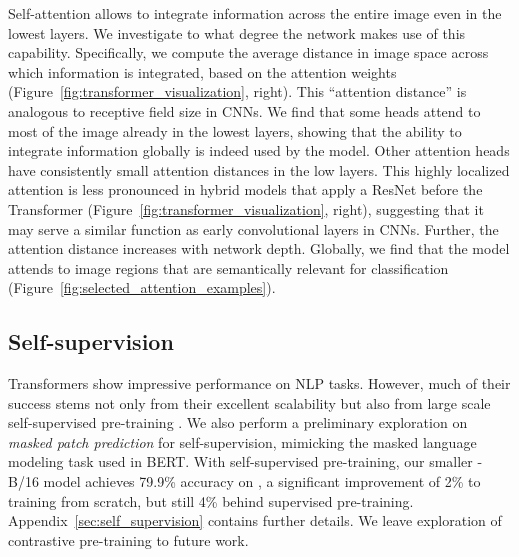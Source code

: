 Self-attention allows \oursabbrv to integrate information across the entire image even in the lowest layers. We investigate to what degree the network makes use of this capability. Specifically, we compute the average distance in image space across which information is integrated, based on the attention weights (Figure~\ref{fig:transformer_visualization}, right). This ``attention distance'' is analogous to receptive field size in CNNs. We find that some heads attend to most of the image already in the lowest layers, showing that the ability to integrate information globally is indeed used by the model. Other attention heads have consistently small attention distances in the low layers. This highly localized attention is less pronounced in hybrid models that apply a ResNet before the Transformer (Figure~\ref{fig:transformer_visualization}, right), suggesting that it may serve a similar function as early convolutional layers in CNNs. 
Further, the attention distance increases with network depth.
Globally, we find that the model attends to image regions that are semantically relevant for classification (Figure~\ref{fig:selected_attention_examples}).


\subsection{Self-supervision}
Transformers show impressive performance on NLP tasks. However, much of their success stems not only from their excellent scalability but also from large scale self-supervised pre-training \citep{devlin19-bert,radford2018-gpt}. We also perform a preliminary exploration on \textit{masked patch prediction} for self-supervision, mimicking the masked language modeling task used in BERT. With self-supervised pre-training, our smaller \oursabbrv-B/16 model achieves 79.9\% accuracy on \imagenet{}, a significant improvement of 2\% to training from scratch, but still 4\% behind supervised pre-training. Appendix~\ref{sec:self_supervision} contains further details.
We leave exploration of contrastive pre-training \citep{Chen2020simclr,he2020moco,bachman2019amdim,henaff2020cpc} to future work.




